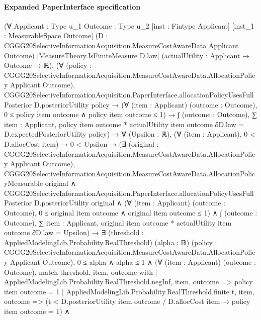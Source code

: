 \documentclass[10pt]{article}
\begin{document}
\paragraph{Expanded PaperInterface specification}
\begin{ReviewVerbatim}
(∀ {Applicant : Type u_1} {Outcome : Type u_2} [inst : Fintype Applicant] [inst_1 : MeasurableSpace Outcome]
    (D : CGGG20SelectiveInformationAcquisition.MeasureCostAwareData Applicant Outcome)
    [MeasureTheory.IsFiniteMeasure D.law] (actualUtility : Applicant → Outcome → ℝ),
    (∀ (policy : CGGG20SelectiveInformationAcquisition.MeasureCostAwareData.AllocationPolicy Applicant Outcome),
        CGGG20SelectiveInformationAcquisition.PaperInterface.allocationPolicyUsesFullPosterior D.posteriorUtility
            policy →
          (∀ (item : Applicant) (outcome : Outcome), 0 ≤ policy item outcome ∧ policy item outcome ≤ 1) →
            ∫ (outcome : Outcome), ∑ item : Applicant, policy item outcome * actualUtility item outcome ∂D.law =
              D.expectedPosteriorUtility policy) →
      ∀ (Upsilon : ℝ),
        (∀ (item : Applicant), 0 < D.allocCost item) →
          0 < Upsilon →
            (∃ (original :
                CGGG20SelectiveInformationAcquisition.MeasureCostAwareData.AllocationPolicy Applicant Outcome),
                CGGG20SelectiveInformationAcquisition.MeasureCostAwareData.AllocationPolicyMeasurable original ∧
                  CGGG20SelectiveInformationAcquisition.PaperInterface.allocationPolicyUsesFullPosterior
                      D.posteriorUtility original ∧
                    (∀ (item : Applicant) (outcome : Outcome), 0 ≤ original item outcome ∧ original item outcome ≤ 1) ∧
                      ∫ (outcome : Outcome),
                          ∑ item : Applicant, original item outcome * actualUtility item outcome ∂D.law =
                        Upsilon) →
              ∃ (threshold : AppliedModelingLib.Probability.RealThreshold) (alpha : ℝ) (policy :
                CGGG20SelectiveInformationAcquisition.MeasureCostAwareData.AllocationPolicy Applicant Outcome),
                0 ≤ alpha ∧
                  alpha ≤ 1 ∧
                    (∀ (item : Applicant) (outcome : Outcome),
                        match threshold, item, outcome with
                        | AppliedModelingLib.Probability.RealThreshold.negInf, item, outcome => policy item outcome = 1
                        | AppliedModelingLib.Probability.RealThreshold.finite t, item, outcome =>
                          (t < D.posteriorUtility item outcome / D.allocCost item → policy item outcome = 1) ∧

\end{ReviewVerbatim}
\end{document}
